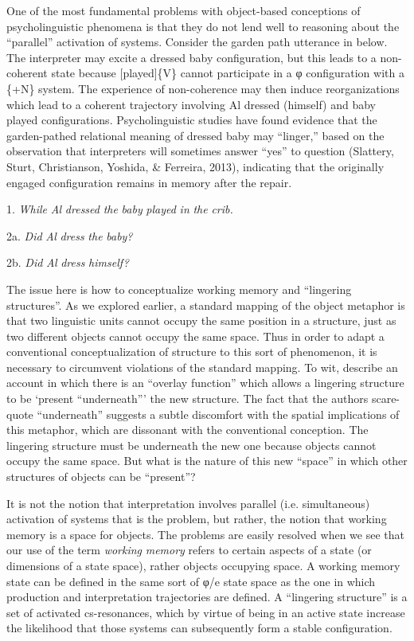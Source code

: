 One of the most fundamental problems with object-based conceptions of psycholinguistic phenomena is that they do not lend well to reasoning about the “parallel” activation of systems. Consider the garden path utterance in  below. The interpreter may excite a {\textbar}dressed baby{\textbar} configuration, but this leads to a non-coherent state because [played]\{V\} cannot participate in a φ configuration with a \{+N\} system. The experience of non-coherence may then induce reorganizations which lead to a coherent trajectory involving {\textbar}Al dressed (himself){\textbar} and {\textbar}baby played{\textbar} configurations. Psycholinguistic studies have found evidence that the garden-pathed relational meaning of {\textbar}dressed baby{\textbar} may “linger,” based on the observation that interpreters will sometimes answer “yes” to question  (Slattery, Sturt, Christianson, Yoshida, \& Ferreira, 2013), indicating that the originally engaged configuration remains in memory after the repair.

1. \textit{While} \textit{Al} \textit{dressed} \textit{the} \textit{baby} \textit{played} \textit{in} \textit{the} \textit{crib.}

2a. \textit{Did} \textit{Al} \textit{dress} \textit{the} \textit{baby?}

2b. \textit{Did} \textit{Al} \textit{dress} \textit{himself?}

The issue here is how to conceptualize working memory and “lingering structures”. As we explored earlier, a standard mapping of the object metaphor is that two linguistic units cannot occupy the same position in a structure, just as two different objects cannot occupy the same space. Thus in order to adapt a conventional conceptualization of structure to this sort of phenomenon, it is necessary to circumvent violations of the standard mapping. To wit, \citet{SlatteryEtAl2013} describe an account in which there is an “overlay function” which allows a lingering structure to be ‘present “underneath”’ the new structure. The fact that the authors scare-quote “underneath” suggests a subtle discomfort with the spatial implications of this metaphor, which are dissonant with the conventional conception. The lingering structure must be underneath the new one because objects cannot occupy the same space. But what is the nature of this new “space” in which other structures of objects can be “present”?

It is not the notion that interpretation involves parallel (i.e. simultaneous) activation of systems that is the problem, but rather, the notion that working memory is a space for objects. The problems are easily resolved when we see that our use of the term \textit{working} \textit{memory} refers to certain aspects of a state (or dimensions of a state space), rather objects occupying space. A working memory state can be defined in the same sort of φ/e state space as the one in which production and interpretation trajectories are defined. A “lingering structure” is a set of activated cs-resonances, which by virtue of being in an active state increase the likelihood that those systems can subsequently form a stable configuration.

